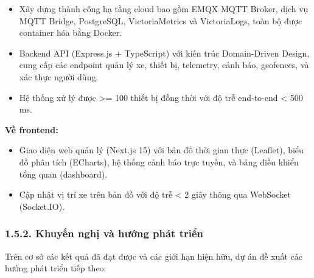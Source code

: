 \documentclass[13pt,a4paper]{extarticle}
\renewcommand{\\}{\thesislongtableorignewline\hline}%
\providecommand{\tightlist}{%
  \setlength{\itemsep}{0pt}\setlength{\parskip}{0pt}}
\begin{document}
\begin{itemize}
\tightlist
\item
  Xây dựng thành công hạ tầng cloud bao gồm EMQX MQTT Broker, dịch vụ
  MQTT Bridge, PostgreSQL, VictoriaMetrics và VictoriaLogs, toàn bộ được
  container hóa bằng Docker.
\item
  Backend API (Express.js + TypeScript) với kiến trúc Domain-Driven
  Design, cung cấp các endpoint quản lý xe, thiết bị, telemetry, cảnh
  báo, geofences, và xác thực người dùng.
\item
  Hệ thống xử lý được \textgreater= 100 thiết bị đồng thời với độ trễ
  end-to-end \textless{} 500 ms.
\end{itemize}

\textbf{Về frontend:}

\begin{itemize}
\tightlist
\item
  Giao diện web quản lý (Next.js 15) với bản đồ thời gian thực
  (Leaflet), biểu đồ phân tích (ECharts), hệ thống cảnh báo trực tuyến,
  và bảng điều khiển tổng quan (dashboard).
\item
  Cập nhật vị trí xe trên bản đồ với độ trễ \textless{} 2 giây thông qua
  WebSocket (Socket.IO).
\end{itemize}

\subsubsection{1.5.2. Khuyến nghị và hướng phát
triển}\label{152-khuyux1ebfn-nghux1ecb-vuxe0-hux1b0ux1edbng-phuxe1t-triux1ec3n}

Trên cơ sở các kết quả đã đạt được và các giới hạn hiện hữu, dự án đề
xuất các hướng phát triển tiếp theo:
\end{document}
